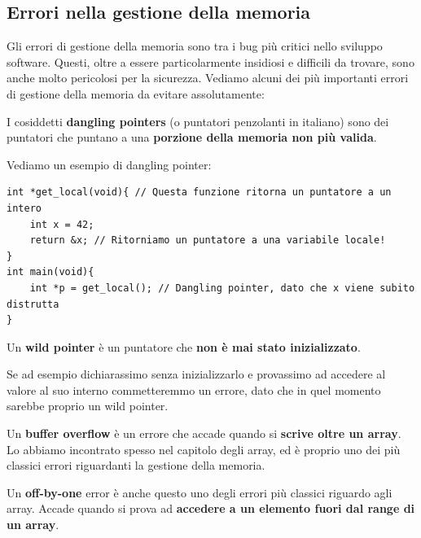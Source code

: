 \documentclass[11pt, a4paper, titlepage, oneside]{scrbook}
\begin{document}
\subsection{Errori nella gestione della memoria}

Gli errori di gestione della memoria sono tra i bug più critici nello sviluppo software. Questi, oltre a essere particolarmente insidiosi e difficili da trovare, sono anche molto pericolosi per la sicurezza. Vediamo alcuni dei più importanti errori di gestione della memoria da evitare assolutamente:

\begin{Definizione}
\label{def-dangling-pointer}
I cosiddetti \textbf{dangling pointers} (o puntatori penzolanti in italiano) sono dei puntatori che puntano a una \textbf{porzione della memoria non più valida}.
\end{Definizione}

Vediamo un esempio di dangling pointer:
\begin{lstlisting}[style=C]
int *get_local(void){ // Questa funzione ritorna un puntatore a un intero
    int x = 42;
    return &x; // Ritorniamo un puntatore a una variabile locale!
}
int main(void){
    int *p = get_local(); // Dangling pointer, dato che x viene subito distrutta
}
\end{lstlisting}

\begin{Definizione}
\label{def-wild-pointer}
Un \textbf{wild pointer} è un puntatore che \textbf{non è mai stato inizializzato}.
\end{Definizione}

Se ad esempio dichiarassimo  senza inizializzarlo e provassimo ad accedere al valore al suo interno commetteremmo un errore, dato che in quel momento  sarebbe proprio un wild pointer.

\begin{Definizione}
\label{det-buffer-overflow}
Un \textbf{buffer overflow} è un errore che accade quando si \textbf{scrive oltre un array}. Lo abbiamo incontrato spesso nel capitolo degli array, ed è proprio uno dei più classici errori riguardanti la gestione della memoria.
\end{Definizione}

\begin{Definizione}
\label{def-off-by-one}
Un \textbf{off-by-one} error è anche questo uno degli errori più classici riguardo agli array. Accade quando si prova ad \textbf{accedere a un elemento fuori dal range di un array}.
\end{Definizione}
\end{document}
